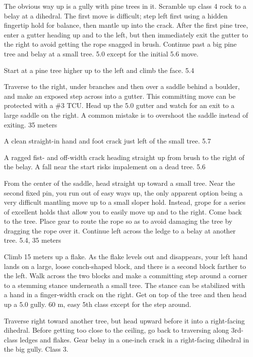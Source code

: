 \documentclass{tahquitz}
\begin{document}
 The obvious way up is a gully with pine trees in it. Scramble up
class 4 rock to a belay at a dihedral. The first move is difficult;
step left first using a hidden fingertip hold for balance, then mantle
up into the crack.
After the first pine tree, enter a gutter heading up
and to the left, but then immediately exit the gutter to the right to
avoid getting the rope snagged in brush. Continue past a big pine
tree and belay at a small tree. 5.0 except for the initial 5.6
move.

 Start at a pine tree higher up to the left and climb
the face. 5.4

 Traverse to the right, under branches and then over a saddle behind a boulder, and make
an exposed step across into a gutter. This committing move can be protected with a
\#3 TCU. Head up the 5.0 gutter and watch for an exit to a large saddle
on the right. A common mistake is to overshoot the saddle instead of
exiting. 35 meters

 A clean straight-in hand and foot crack just left of the small
tree. 5.7

 A ragged fist- and off-width crack heading straight up from brush
to the right of the belay. A fall near the start risks impalement on a dead tree. 5.6

 From the center of the saddle, head straight up toward a small
tree. Near the second fixed pin, you run out of easy ways up, the
only apparent option being a very difficult mantling move up to a
small sloper hold. Instead, grope for a series of excellent holds that allow
you to easily move up and to the right. Come back to the tree. Place
gear to route the rope so as to avoid damaging the tree by dragging
the rope over it. Continue left across the ledge to a belay at
another tree. 5.4, 35 meters

 Climb 15 meters up a flake. As the flake levels out and
disappears, your left hand lands on a large, loose conch-shaped block,
and there is a second block farther to the left. Walk across the two
blocks and make a committing step around a corner to a stemming stance
underneath a small tree. The stance can be stabilized with a hand in a
finger-width crack on the right. Get on top of the tree and then head
up a 5.0 gully. 60 m, easy 5th class except for the step around.

 Traverse right toward another tree, but head upward before
it into a right-facing dihedral.  Before getting too close to the ceiling, go back to traversing
along 3rd-class ledges and flakes.  Gear belay in a one-inch
crack in a right-facing dihedral in the big gully. Class 3.
\end{document}
